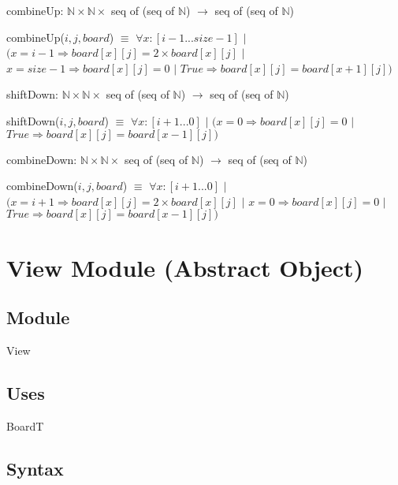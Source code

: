 \documentclass[12pt]{article}
\begin{document}
\bigskip
\bigskip

\noindent combineUp: $\mathbb{N} \times \mathbb{N} \times$ seq of (seq of $\mathbb{N}$) $\rightarrow$ seq of (seq of $\mathbb{N}$)

\medskip

\noindent combineUp($i, j, board$) $\equiv$ $\forall x : [i-1...size-1]$ $|$ $(x = i-1 \Rightarrow board[x][j] = 2 \times board[x][j]$ $|$ $x = size-1 \Rightarrow board[x][j] = 0$ $|$ $True \Rightarrow board[x][j] = board[x+1][j])$

\bigskip
\bigskip

\noindent shiftDown: $\mathbb{N} \times \mathbb{N} \times$ seq of (seq of $\mathbb{N}$) $\rightarrow$ seq of (seq of $\mathbb{N}$) 

\medskip

\noindent shiftDown($i, j, board$) $\equiv$ $\forall x : [i+1...0]$ $|$ $(x = 0 \Rightarrow board[x][j] = 0$ $|$ $True \Rightarrow board[x][j] = board[x-1][j])$

\bigskip
\bigskip

\noindent combineDown: $\mathbb{N} \times \mathbb{N} \times$ seq of (seq of $\mathbb{N}$) $\rightarrow$ seq of (seq of $\mathbb{N}$)

\medskip

\noindent combineDown($i, j, board$) $\equiv$ $\forall x : [i+1...0]$ $|$ $(x = i+1 \Rightarrow board[x][j] = 2 \times board[x][j]$ $|$ $x = 0 \Rightarrow board[x][j] = 0$ $|$ $True \Rightarrow board[x][j] = board[x-1][j])$

\bigskip
\bigskip


\newpage

\section* {View Module (Abstract Object)}

\subsection* {Module}

View

\subsection* {Uses}

BoardT

\subsection* {Syntax}
\end{document}

